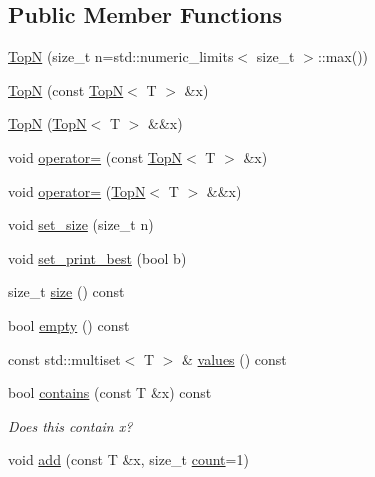 \subsection*{Public Member Functions}
\begin{DoxyCompactItemize}
\item 
\hyperlink{class_fleet_1_1_statistics_1_1_top_n_afd0ca4daca84e66e91a4101cb009af44}{TopN} (size\+\_\+t n=std\+::numeric\+\_\+limits$<$ size\+\_\+t $>$\+::max())
\item 
\hyperlink{class_fleet_1_1_statistics_1_1_top_n_a3c7b5c9c3fd6e171a0b2d6b1f48cddf3}{TopN} (const \hyperlink{class_fleet_1_1_statistics_1_1_top_n}{TopN}$<$ T $>$ \&x)
\item 
\hyperlink{class_fleet_1_1_statistics_1_1_top_n_af1a27643fa0841afaa7e8ca0e87d9a49}{TopN} (\hyperlink{class_fleet_1_1_statistics_1_1_top_n}{TopN}$<$ T $>$ \&\&x)
\item 
void \hyperlink{class_fleet_1_1_statistics_1_1_top_n_a38d3aba302a215992c603ff2ab13e8fc}{operator=} (const \hyperlink{class_fleet_1_1_statistics_1_1_top_n}{TopN}$<$ T $>$ \&x)
\item 
void \hyperlink{class_fleet_1_1_statistics_1_1_top_n_a6653acde6effd65aa0226cbefc2c8f4f}{operator=} (\hyperlink{class_fleet_1_1_statistics_1_1_top_n}{TopN}$<$ T $>$ \&\&x)
\item 
void \hyperlink{class_fleet_1_1_statistics_1_1_top_n_a3151da8c2aaab75195d6f702fbfba436}{set\+\_\+size} (size\+\_\+t n)
\item 
void \hyperlink{class_fleet_1_1_statistics_1_1_top_n_a762c937fe5dcab09d87d2414201b6b1e}{set\+\_\+print\+\_\+best} (bool b)
\item 
size\+\_\+t \hyperlink{class_fleet_1_1_statistics_1_1_top_n_a0ce96f95fbac59ba2a858b66b5a6690a}{size} () const
\item 
bool \hyperlink{class_fleet_1_1_statistics_1_1_top_n_ac2b70eef6c75a0459acc88b2539dbc0b}{empty} () const
\item 
const std\+::multiset$<$ T $>$ \& \hyperlink{class_fleet_1_1_statistics_1_1_top_n_ab7ab88abe1dd8afe6ffecf9206cbceb7}{values} () const
\item 
bool \hyperlink{class_fleet_1_1_statistics_1_1_top_n_a0e09337a1f36d16a25b03d63f68952a0}{contains} (const T \&x) const
\begin{DoxyCompactList}\small\item\em Does this contain x? \end{DoxyCompactList}\item 
void \hyperlink{class_fleet_1_1_statistics_1_1_top_n_a71f34724832a34c029bfeeb6e1dea24f}{add} (const T \&x, size\+\_\+t \hyperlink{class_fleet_1_1_statistics_1_1_top_n_a341df027d3283fe3a9bf3766521e126d}{count}=1)

\end{DoxyCompactItemize}
